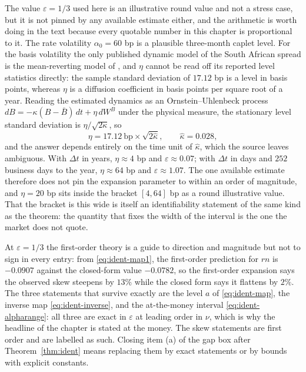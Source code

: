 \documentclass[../../../main.tex]{subfiles}
\begin{document}
\begin{remark}\label{rem:ident-epsilon}
The value $\varepsilon=1/3$ used here is an illustrative round value and not a stress case, but it is not pinned by any available estimate either, and the arithmetic is worth doing in the text because every quotable number in this chapter is proportional to it. The rate volatility $\alpha_0=60$ bp is a plausible three-month caplet level. For the basis volatility the only published dynamic model of the South African spread is the mean-reverting model of \citet[Sec.~5.1, Table~4]{alfeus2026}, and $\eta$ cannot be read off its reported level statistics directly: the sample standard deviation of $17.12$ bp \citep[Sec.~3, p.~5]{alfeus2026} is a level in basis points, whereas $\eta$ is a diffusion coefficient in basis points per square root of a year. Reading the estimated dynamics as an Ornstein--Uhlenbeck process $dB=-\kappa(B-\bar B)\,dt+\eta\,dW^B$ under the physical measure, the stationary level standard deviation is $\eta/\sqrt{2\kappa}$, so
\begin{equation}\label{eq:ident-etabracket}
\eta=17.12\ \text{bp}\times\sqrt{2\hat\kappa},\qquad \hat\kappa=0.028 ,
\end{equation}
and the answer depends entirely on the time unit of $\hat\kappa$, which the source leaves ambiguous. With $\Delta t$ in years, $\eta\approx4$ bp and $\varepsilon\approx0.07$; with $\Delta t$ in days and $252$ business days to the year, $\eta\approx64$ bp and $\varepsilon\approx1.07$. The one available estimate therefore does not pin the expansion parameter to within an order of magnitude, and $\eta=20$ bp sits inside the bracket $[4,64]$ bp as a round illustrative value. That the bracket is this wide is itself an identifiability statement of the same kind as the theorem: the quantity that fixes the width of the interval is the one the market does not quote.

At $\varepsilon=1/3$ the first-order theory is a guide to direction and magnitude but not to sign in every entry: from \eqref{eq:ident-map1}, the first-order prediction for $rn$ is $-0.0907$ against the closed-form value $-0.0782$, so the first-order expansion says the observed skew steepens by $13\%$ while the closed form says it flattens by $2\%$. The three statements that survive exactly are the level $a$ of \eqref{eq:ident-map}, the inverse map \eqref{eq:ident-inverse}, and the at-the-money interval \eqref{eq:ident-alpharange}: all three are exact in $\varepsilon$ at leading order in $\nu$, which is why the headline of the chapter is stated at the money. The skew statements are first order and are labelled as such. Closing item (a) of the gap box after Theorem~\ref{thm:ident} means replacing them by exact statements or by bounds with explicit constants.
\end{remark}
\end{document}
